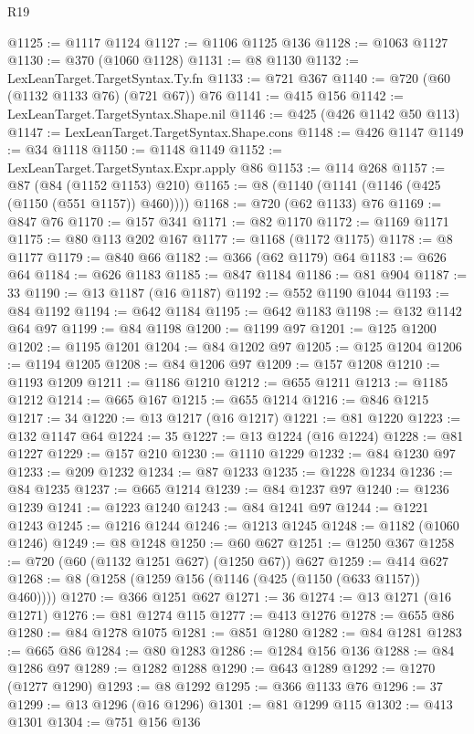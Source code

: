 \begin{lexlean}{R19}
\begin{coremodule}
{{{{{{{{{{{{{{{{{{{{{{{{{{{{{{{{{{{{{{{{{{{{{{{{{{{{{{{{{{{{{{{{{{{{{{{{{{{{{{{{{{{{{{{@1125 := @1117 @1124
@1127 := @1106 @1125 @136
@1128 := @1063 @1127
@1130 := @370 (@1060 @1128)
@1131 := @8 @1130
@1132 := LexLeanTarget.TargetSyntax.Ty.fn
@1133 := @721 @367
@1140 := @720 (@60 (@1132 @1133 @76) (@721 @67)) @76
@1141 := @415 @156
@1142 := LexLeanTarget.TargetSyntax.Shape.nil
@1146 := @425 (@426 @1142 @50 @113)
@1147 := LexLeanTarget.TargetSyntax.Shape.cons
@1148 := @426 @1147
@1149 := @34 @1118
@1150 := @1148 @1149
@1152 := LexLeanTarget.TargetSyntax.Expr.apply @86
@1153 := @114 @268
@1157 := @87 (@84 (@1152 @1153) @210)
@1165 := @8 (@1140 (@1141 (@1146 (@425 (@1150 (@551 @1157)) @460))))
@1168 := @720 (@62 @1133) @76
@1169 := @847 @76
@1170 := @157 @341
@1171 := @82 @1170
@1172 := @1169 @1171
@1175 := @80 @113 @202 @167
@1177 := @1168 (@1172 @1175)
@1178 := @8 @1177
@1179 := @840 @66
@1182 := @366 (@62 @1179) @64
@1183 := @626 @64
@1184 := @626 @1183
@1185 := @847 @1184
@1186 := @81 @904
@1187 := 33
@1190 := @13 @1187 (@16 @1187)
@1192 := @552 @1190 @1044
@1193 := @84 @1192
@1194 := @642 @1184
@1195 := @642 @1183
@1198 := @132 @1142 @64 @97
@1199 := @84 @1198
@1200 := @1199 @97
@1201 := @125 @1200
@1202 := @1195 @1201
@1204 := @84 @1202 @97
@1205 := @125 @1204
@1206 := @1194 @1205
@1208 := @84 @1206 @97
@1209 := @157 @1208
@1210 := @1193 @1209
@1211 := @1186 @1210
@1212 := @655 @1211
@1213 := @1185 @1212
@1214 := @665 @167
@1215 := @655 @1214
@1216 := @846 @1215
@1217 := 34
@1220 := @13 @1217 (@16 @1217)
@1221 := @81 @1220
@1223 := @132 @1147 @64
@1224 := 35
@1227 := @13 @1224 (@16 @1224)
@1228 := @81 @1227
@1229 := @157 @210
@1230 := @1110 @1229
@1232 := @84 @1230 @97
@1233 := @209 @1232
@1234 := @87 @1233
@1235 := @1228 @1234
@1236 := @84 @1235
@1237 := @665 @1214
@1239 := @84 @1237 @97
@1240 := @1236 @1239
@1241 := @1223 @1240
@1243 := @84 @1241 @97
@1244 := @1221 @1243
@1245 := @1216 @1244
@1246 := @1213 @1245
@1248 := @1182 (@1060 @1246)
@1249 := @8 @1248
@1250 := @60 @627
@1251 := @1250 @367
@1258 := @720 (@60 (@1132 @1251 @627) (@1250 @67)) @627
@1259 := @414 @627
@1268 := @8 (@1258 (@1259 @156 (@1146 (@425 (@1150 (@633 @1157)) @460))))
@1270 := @366 @1251 @627
@1271 := 36
@1274 := @13 @1271 (@16 @1271)
@1276 := @81 @1274 @115
@1277 := @413 @1276
@1278 := @655 @86
@1280 := @84 @1278 @1075
@1281 := @851 @1280
@1282 := @84 @1281
@1283 := @665 @86
@1284 := @80 @1283
@1286 := @1284 @156 @136
@1288 := @84 @1286 @97
@1289 := @1282 @1288
@1290 := @643 @1289
@1292 := @1270 (@1277 @1290)
@1293 := @8 @1292
@1295 := @366 @1133 @76
@1296 := 37
@1299 := @13 @1296 (@16 @1296)
@1301 := @81 @1299 @115
@1302 := @413 @1301
@1304 := @751 @156 @136
}}}}}}}}}}}}}}}}}}}}}}}}}}}}}}}}}}}}}}}}}}}}}}}}}}}}}}}}}}}}}}}}}}}}}}}}}}}}}}}}}}}}}}}
\end{coremodule}
\end{lexlean}
